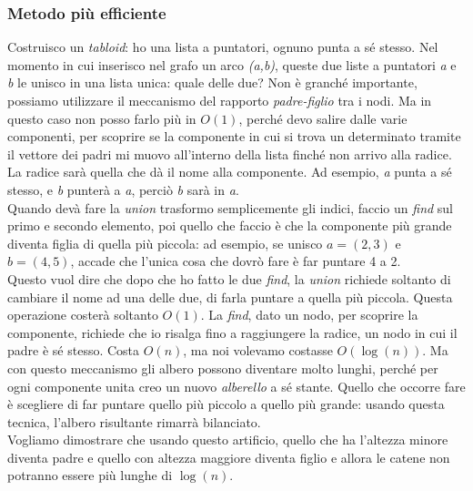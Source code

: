 \subsubsection{Metodo più efficiente}
Costruisco un \textit{tabloid}: ho una lista a puntatori, ognuno punta a sé stesso. Nel momento in cui inserisco nel grafo un arco \textit{(a,b)}, queste due liste a puntatori \textit{a} e \textit{b} le unisco in una lista unica: quale delle due? Non è granché importante, possiamo utilizzare il meccanismo del rapporto \textit{padre-figlio} tra i nodi. Ma in questo caso non posso farlo più in $O(1)$, perché devo salire dalle varie componenti, per scoprire se la componente in cui si trova un determinato tramite il vettore dei padri mi muovo all'interno della lista finché non arrivo alla radice. La radice sarà quella che dà il nome alla componente. Ad esempio, \textit{a} punta a sé stesso, e \textit{b} punterà a \textit{a}, perciò \textit{b} sarà in \textit{a}. \\
Quando devà fare la \textit{union} trasformo semplicemente gli indici, faccio un \textit{find} sul primo e secondo elemento, poi quello che faccio è che la componente più grande diventa figlia di quella più piccola: ad esempio, se unisco $a=(2,3)$ e $b=(4,5)$, accade che l'unica cosa che dovrò fare è far puntare 4 a 2. \\
Questo vuol dire che dopo che ho fatto le due \textit{find}, la \textit{union} richiede soltanto di cambiare il nome ad una delle due, di farla puntare a quella più piccola. Questa operazione costerà soltanto $O(1)$. La \textit{find}, dato un nodo, per scoprire la componente, richiede che io risalga fino a raggiungere la radice, un nodo in cui il padre è sé stesso. Costa $O(n)$, ma noi volevamo costasse $O(\log(n))$. Ma con questo meccanismo gli albero possono diventare molto lunghi, perché per ogni componente unita creo un nuovo \textit{alberello} a sé stante. Quello che occorre fare è scegliere di far puntare quello più piccolo a quello più grande: usando questa tecnica, l'albero risultante rimarrà bilanciato. \\
Vogliamo dimostrare che usando questo artificio, quello che ha l'altezza minore diventa padre e quello con altezza maggiore diventa figlio e allora le catene non potranno essere più lunghe di $\log(n)$.
